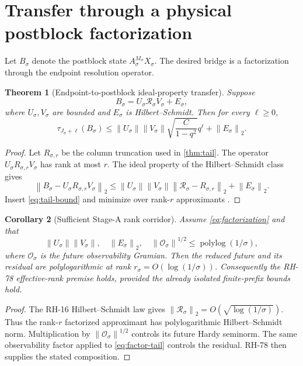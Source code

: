 \documentclass[11pt]{article}
\newtheorem{theorem}{Theorem}[section]
\newtheorem{corollary}[theorem]{Corollary}
\theoremstyle{remark}
\newcommand{\norm}[1]{\left\lVert#1\right\rVert}
\newcommand{\cR}{\mathcal R}
\newcommand{\cO}{\mathcal O}
\begin{document}
\section{Transfer through a physical postblock factorization}

Let $B_\sigma$ denote the postblock state $A_\sigma^{M_\sigma}X_\sigma$.
The desired bridge is a factorization through the endpoint resolution
operator.

\begin{theorem}[Endpoint-to-postblock ideal-property transfer]
\label{thm:factor}
Suppose
\begin{equation}
 B_\sigma=U_\sigma\cR_\sigma V_\sigma+E_\sigma,
 \label{eq:factorization}
\end{equation}
where $U_\sigma,V_\sigma$ are bounded and $E_\sigma$ is Hilbert--Schmidt.
Then for every $\ell\ge0$,
\begin{equation}
 \boxed{
 \tau_{J_\sigma+\ell}(B_\sigma)
 \le
 \norm{U_\sigma}\norm{V_\sigma}
 \sqrt{\frac{C}{1-q^2}}q^\ell
 +\norm{E_\sigma}_2.}
 \label{eq:factor-tail}
\end{equation}
\end{theorem}

\begin{proof}
Let $R_{\sigma,r}$ be the column truncation used in
\cref{thm:tail}.  The operator
$U_\sigma R_{\sigma,r}V_\sigma$ has rank at most $r$.  The ideal property of
the Hilbert--Schmidt class gives
\[
 \norm{B_\sigma-U_\sigma R_{\sigma,r}V_\sigma}_2
 \le\norm{U_\sigma}\norm{V_\sigma}
 \norm{\cR_\sigma-R_{\sigma,r}}_2+\norm{E_\sigma}_2.
\]
Insert \eqref{eq:tail-bound} and minimize over rank-$r$ approximants
\citep{Simon2005}.
\end{proof}

\begin{corollary}[Sufficient Stage-A rank corridor]
\label{cor:stageA}
Assume \eqref{eq:factorization} and that
\begin{equation}
 \norm{U_\sigma}\norm{V_\sigma},\quad
 \norm{E_\sigma}_2,\quad
 \norm{\cO_\sigma}^{1/2}
 \le \operatorname{polylog}(1/\sigma),
 \label{eq:polylog-factors}
\end{equation}
where $\cO_\sigma$ is the future observability Gramian.  Then the reduced
future and its residual are polylogarithmic at rank
$r_\sigma=O(\log(1/\sigma))$.  Consequently the RH-78 effective-rank
premise holds, provided the already isolated finite-prefix bounds hold.
\end{corollary}

\begin{proof}
The RH-16 Hilbert--Schmidt law gives
$\norm{\cR_\sigma}_2=O(\sqrt{\log(1/\sigma)})$.  Thus the rank-$r$ factorized
approximant has polylogarithmic Hilbert--Schmidt norm.  Multiplication by
$\norm{\cO_\sigma}^{1/2}$ controls its future Hardy seminorm.  The same
observability factor applied to \eqref{eq:factor-tail} controls the residual.
RH-78 then supplies the stated composition.
\end{proof}
\end{document}

